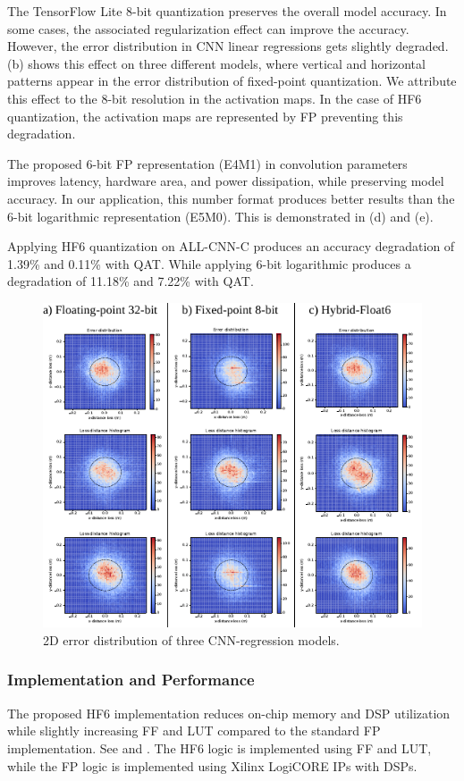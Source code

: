 The TensorFlow Lite 8-bit quantization preserves the overall model accuracy. In some cases, the associated regularization effect can improve the accuracy. However, the error distribution in CNN linear regressions gets slightly degraded. (b) shows this effect on three different models, where vertical and horizontal patterns appear in the error distribution of fixed-point quantization. We attribute this effect to the 8-bit resolution in the activation maps. In the case of HF6 quantization, the activation maps are represented by FP preventing this degradation.

The proposed 6-bit FP representation (E4M1) in convolution parameters improves latency, hardware area, and power dissipation, while preserving model accuracy. In our application, this number format produces better results than the 6-bit logarithmic representation (E5M0). This is demonstrated in (d) and (e).

Applying HF6 quantization on ALL-CNN-C \cite{springenberg2014striving} produces an accuracy degradation of 1.39\% and 0.11\% with QAT. While applying 6-bit logarithmic produces a degradation of 11.18\% and 7.22\% with QAT.

\begin{figure}[b!]
	\centering
	\includegraphics[width=0.5\columnwidth]{./chapters/cnn_accelerator/figures/histograms/2D_error_distribtion.pdf}
	\caption{2D error distribution of three CNN-regression models.}
	\label{fig:2d_error_distribtion}
\end{figure}

\subsubsection{Implementation and Performance}
The proposed HF6 implementation reduces on-chip memory and DSP utilization while slightly increasing FF and LUT compared to the standard FP implementation. See  and . The HF6 logic is implemented using FF and LUT, while the FP logic is implemented using Xilinx LogiCORE IPs with DSPs.

